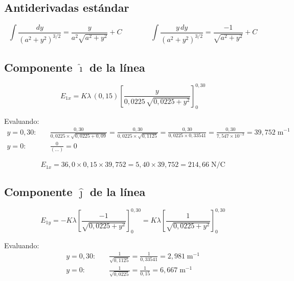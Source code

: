 \documentclass[12pt,letterpaper]{article}
\begin{document}
\subsection*{Antiderivadas est\'andar}

\begin{equation*}
    \int\frac{dy}{(a^2+y^2)^{3/2}} = \frac{y}{a^2\sqrt{a^2+y^2}}+C
    \qquad\qquad
    \int\frac{y\,dy}{(a^2+y^2)^{3/2}} = \frac{-1}{\sqrt{a^2+y^2}}+C
\end{equation*}

\subsection*{Componente $\hat{\imath}$ de la l\'inea}

\begin{equation*}
    E_{1x} = K\lambda\,(0{,}15)
    \left[\frac{y}{0{,}0225\,\sqrt{0{,}0225+y^2}}\right]_0^{0{,}30}
\end{equation*}

Evaluando:
\begin{align*}
    y = 0{,}30:\quad
    &\frac{0{,}30}{0{,}0225\times\sqrt{0{,}0225+0{,}09}}
    = \frac{0{,}30}{0{,}0225\times\sqrt{0{,}1125}}
    = \frac{0{,}30}{0{,}0225\times0{,}33541}
    = \frac{0{,}30}{7{,}547\times10^{-3}}
    = 39{,}752\;\text{m}^{-1}\\[4pt]
    y = 0:\quad &\frac{0}{(\ldots)} = 0
\end{align*}

\begin{equation*}
    E_{1x} = 36{,}0\times0{,}15\times39{,}752 = 5{,}40\times39{,}752
    = 214{,}66\;\text{N/C}
\end{equation*}

\subsection*{Componente $\hat{\jmath}$ de la l\'inea}

\begin{equation*}
    E_{1y} = -K\lambda
    \left[\frac{-1}{\sqrt{0{,}0225+y^2}}\right]_0^{0{,}30}
    = K\lambda
    \left[\frac{1}{\sqrt{0{,}0225+y^2}}\right]_0^{0{,}30}
\end{equation*}

Evaluando:
\begin{align*}
    y = 0{,}30:\quad &\frac{1}{\sqrt{0{,}1125}} = \frac{1}{0{,}33541} = 2{,}981\;\text{m}^{-1}\\[4pt]
    y = 0:\quad &\frac{1}{\sqrt{0{,}0225}} = \frac{1}{0{,}15} = 6{,}667\;\text{m}^{-1}
\end{align*}
\end{document}
